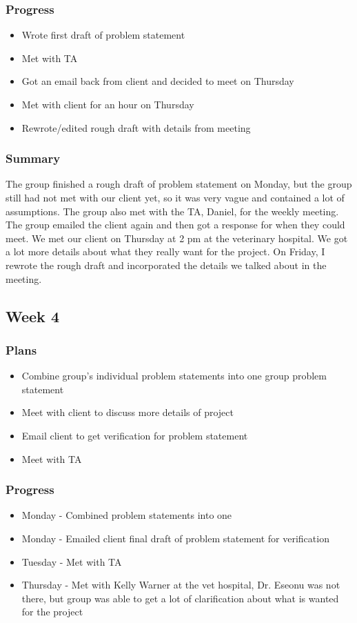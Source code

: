 \documentclass[onecolumn, draftclsnofoot,10pt, compsoc]{IEEEtran}
\begin{document}
\subsubsection{Progress}
\begin{itemize}
\item Wrote first draft of problem statement
\item Met with TA
\item Got an email back from client and decided to meet on Thursday
\item Met with client for an hour on Thursday
\item Rewrote/edited rough draft with details from meeting
\end{itemize}
\subsubsection{Summary}
The group  finished a rough draft of problem statement on Monday, but the group still had not met with our client yet, so it was very vague and contained a lot of assumptions. The group also met with the TA, Daniel, for the weekly meeting. The group emailed the client again and then got a response for when they could meet. We met our client on Thursday at 2 pm at the veterinary hospital. We got a lot more details about what they really want for the project. On Friday, I rewrote the rough draft and incorporated the details we talked about in the meeting. 

\subsection{Week 4}

\subsubsection{Plans}
\begin{itemize}
\item Combine group's individual problem statements into one group problem statement
\item Meet with client to discuss more details of project
\item Email client to get verification for problem statement
\item Meet with TA
\end{itemize}

\subsubsection{Progress}
\begin{itemize}
\item Monday - Combined problem statements into one
\item Monday - Emailed client final draft of problem statement for verification
\item Tuesday  - Met with TA
\item Thursday - Met with Kelly Warner at the vet hospital, Dr. Eseonu was not there, but group was able to get a lot of clarification about what is wanted for the project

\end{itemize}
\end{document}
